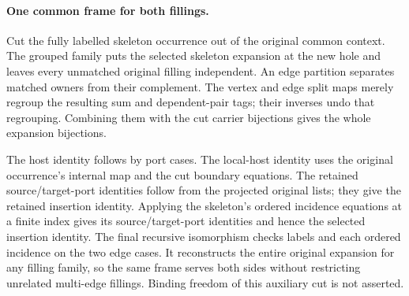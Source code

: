 \par{}
\par{}

\paragraph{One common frame for both fillings.}
Cut the fully labelled skeleton occurrence out of the original common
context. The grouped family puts the selected skeleton expansion at the
new hole and leaves every unmatched original filling independent. An edge
partition separates matched owners from their complement. The vertex and
edge split maps merely regroup the resulting sum and dependent-pair tags;
their inverses undo that regrouping. Combining them with the cut carrier
bijections gives the whole expansion bijections.

The host identity follows by port cases. The local-host identity uses the
original occurrence's internal map and the cut boundary equations. The
retained source/target-port identities follow from the projected original
lists; they give the retained insertion identity. Applying the skeleton's
ordered incidence equations at a finite index gives its source/target-port
identities and hence the selected insertion identity. The final recursive
isomorphism checks labels and each ordered incidence on the two edge cases.
It reconstructs the entire original expansion for any filling family, so
the same frame serves both sides without restricting unrelated multi-edge
fillings. Binding freedom of this auxiliary cut is not asserted.


